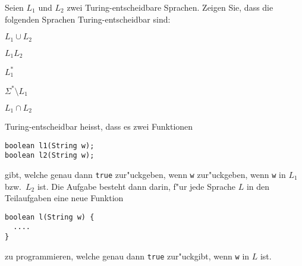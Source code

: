 Seien $L_1$ und $L_2$ zwei Turing-entscheidbare Sprachen. Zeigen Sie, dass
die folgenden Sprachen Turing-entscheidbar sind:
\begin{teilaufgaben}
\item $L_1\cup L_2$
\item $L_1L_2$
\item $L_1^*$
\item $\Sigma^*\setminus L_1$
\item $L_1\cap L_2$
\end{teilaufgaben}

\begin{hinweis}
Turing-entscheidbar heisst, dass es zwei Funktionen 
\begin{verbatim}
boolean l1(String w);
boolean l2(String w);
\end{verbatim}
gibt, welche genau dann \texttt{true} zur"uckgeben, wenn \texttt{w}
zur"uckgeben, wenn \texttt{w} in $L_1$ bzw.~$L_2$ ist. Die Aufgabe
besteht dann darin, f"ur jede Sprache $L$ in den Teilaufgaben eine neue
Funktion
\begin{verbatim}
boolean l(String w) {
  ....
}
\end{verbatim}
zu programmieren, welche genau dann \texttt{true} zur"uckgibt, wenn
\texttt{w} in $L$ ist.
\end{hinweis}

